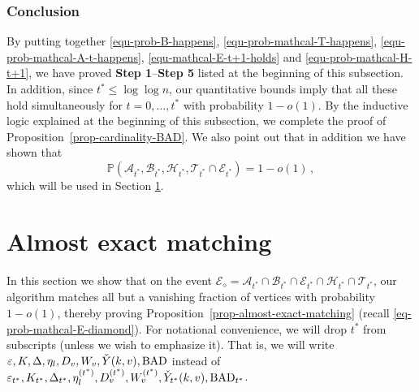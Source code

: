 \documentclass[11pt]{article}
\numberwithin{equation}{section}
\begin{document}
\subsubsection{Conclusion}
By putting together \eqref{equ-prob-B-happens}, \eqref{equ-prob-mathcal-T-happens}, \eqref{equ-prob-mathcal-A-t-happens}, \eqref{equ-mathcal-E-t+1-holds} and \eqref{equ-prob-mathcal-H-t+1}, we have proved {\bf Step 1}--{\bf Step 5} listed at the beginning of this subsection. In addition, since $t^*\leq \log \log n$, our quantitative bounds imply that all these hold simultaneously for $t = 0, \ldots, t^*$ with probability $1-o(1)$. By the inductive logic explained at the beginning of this subsection, we complete the proof of Proposition~\ref{prop-cardinality-BAD}. We also point out that in addition we have shown that 
\begin{equation}\label{eq-prob-mathcal-E-diamond}
\mathbb P(\mathcal{A}_{t^*}, \mathcal B_{t^*}, \mathcal{H}_{t^*}, \mathcal{T}_{t^*} \cap \mathcal E_{t^*}) = 1-o(1)\,,
\end{equation}
 which will be used in Section \ref{sec:almost-exact-matching}. 







\section{Almost exact matching} \label{sec:almost-exact-matching}

In this section we show that on the event $\mathcal{E}_{\diamond}= \mathcal{A}_{t^*} \cap \mathcal{B}_{t^*} \cap \mathcal{E}_{t^*} \cap \mathcal{H}_{t^*} \cap \mathcal{T}_{t^*}$, our algorithm matches all but a vanishing fraction of vertices with probability $1-o(1)$, thereby proving Proposition~\ref{prop-almost-exact-matching} (recall \eqref{eq-prob-mathcal-E-diamond}). For notational convenience, we will drop $t^*$ from subscripts (unless we wish to emphasize it). That is,  we will write $\varepsilon, K, \Delta, \eta_l, D_v, W_v,  \Check{Y}(k,v), \mathrm{BAD}$ instead of $\varepsilon_{t^*}, K_{t^*}, \Delta_{t^*}, \eta^{(t^*)}_l, D^{(t^*)}_v, W^{(t^*)}_v, \Check{Y}_{t^*} (k,v), \mathrm{BAD}_{t^*}$. 
\end{document}
